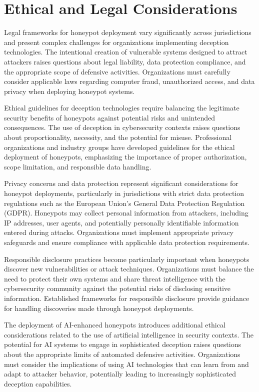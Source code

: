 \section{Ethical and Legal Considerations}

Legal frameworks for honeypot deployment vary significantly across jurisdictions and present complex challenges for organizations implementing deception technologies. The intentional creation of vulnerable systems designed to attract attackers raises questions about legal liability, data protection compliance, and the appropriate scope of defensive activities. Organizations must carefully consider applicable laws regarding computer fraud, unauthorized access, and data privacy when deploying honeypot systems.

Ethical guidelines for deception technologies require balancing the legitimate security benefits of honeypots against potential risks and unintended consequences. The use of deception in cybersecurity contexts raises questions about proportionality, necessity, and the potential for misuse. Professional organizations and industry groups have developed guidelines for the ethical deployment of honeypots, emphasizing the importance of proper authorization, scope limitation, and responsible data handling.

Privacy concerns and data protection represent significant considerations for honeypot deployments, particularly in jurisdictions with strict data protection regulations such as the European Union's General Data Protection Regulation (GDPR). Honeypots may collect personal information from attackers, including IP addresses, user agents, and potentially personally identifiable information entered during attacks. Organizations must implement appropriate privacy safeguards and ensure compliance with applicable data protection requirements.

Responsible disclosure practices become particularly important when honeypots discover new vulnerabilities or attack techniques. Organizations must balance the need to protect their own systems and share threat intelligence with the cybersecurity community against the potential risks of disclosing sensitive information. Established frameworks for responsible disclosure provide guidance for handling discoveries made through honeypot deployments.

The deployment of AI-enhanced honeypots introduces additional ethical considerations related to the use of artificial intelligence in security contexts. The potential for AI systems to engage in sophisticated deception raises questions about the appropriate limits of automated defensive activities. Organizations must consider the implications of using AI technologies that can learn from and adapt to attacker behavior, potentially leading to increasingly sophisticated deception capabilities.


